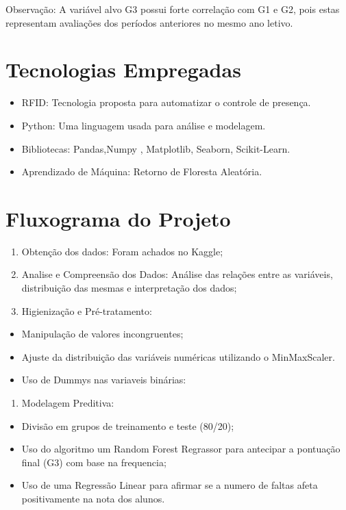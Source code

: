 \documentclass[
  letterpaper,
  DIV=11,
  numbers=noendperiod,
  openany]{scrreprt}
\providecommand{\tightlist}{%
  \setlength{\itemsep}{0pt}\setlength{\parskip}{0pt}}
\begin{document}
Observação: A variável alvo G3 possui forte correlação com G1 e G2, pois
estas representam avaliações dos períodos anteriores no mesmo ano
letivo.

\section{Tecnologias Empregadas}\label{tecnologias-empregadas}

\begin{itemize}
\tightlist
\item
  RFID: Tecnologia proposta para automatizar o controle de presença.
\item
  Python: Uma linguagem usada para análise e modelagem.
\item
  Bibliotecas: Pandas,Numpy , Matplotlib, Seaborn, Scikit-Learn.
\item
  Aprendizado de Máquina: Retorno de Floresta Aleatória.
\end{itemize}

\section{Fluxograma do Projeto}\label{fluxograma-do-projeto}

\begin{enumerate}
\def\labelenumi{\arabic{enumi}.}
\item
  Obtenção dos dados: Foram achados no Kaggle;
\item
  Analise e Compreensão dos Dados: Análise das relações entre as
  variáveis, distribuição das mesmas e interpretação dos dados;
\item
  Higienização e Pré-tratamento:
\end{enumerate}

\begin{itemize}
\item
  Manipulação de valores incongruentes;
\item
  Ajuste da distribuição das variáveis numéricas utilizando o
  MinMaxScaler.
\item
  Uso de Dummys nas variaveis binárias:
\end{itemize}

\begin{enumerate}
\def\labelenumi{\arabic{enumi}.}
\setcounter{enumi}{3}
\tightlist
\item
  Modelagem Preditiva:
\end{enumerate}

\begin{itemize}
\tightlist
\item
  Divisão em grupos de treinamento e teste (80/20);
\item
  Uso do algoritmo um Random Forest Regrassor para antecipar a pontuação
  final (G3) com base na frequencia;
\item
  Uso de uma Regressão Linear para afirmar se a numero de faltas afeta
  positivamente na nota dos alunos.
\end{itemize}
\end{document}
